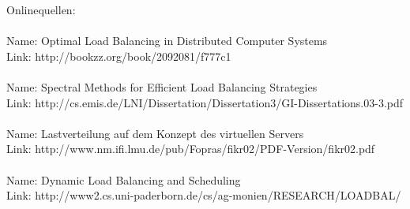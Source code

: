 \documentclass[12p]{article}
\begin{document}
	Onlinequellen:\\
	\\
	Name:    Optimal Load Balancing in Distributed Computer Systems\\
	Link:    http://bookzz.org/book/2092081/f777c1\\
	\\
	Name:    Spectral Methods for Efficient Load Balancing Strategies\\
	Link:    http://cs.emis.de/LNI/Dissertation/Dissertation3/GI-Dissertations.03-3.pdf\\
	\\
	Name:    Lastverteilung auf dem Konzept des virtuellen Servers\\
	Link:    http://www.nm.ifi.lmu.de/pub/Fopras/fikr02/PDF-Version/fikr02.pdf\\
	\\
	Name: Dynamic Load Balancing and Scheduling\\
	Link: http://www2.cs.uni-paderborn.de/cs/ag-monien/RESEARCH/LOADBAL/\\
	\\
	
\end{document}
